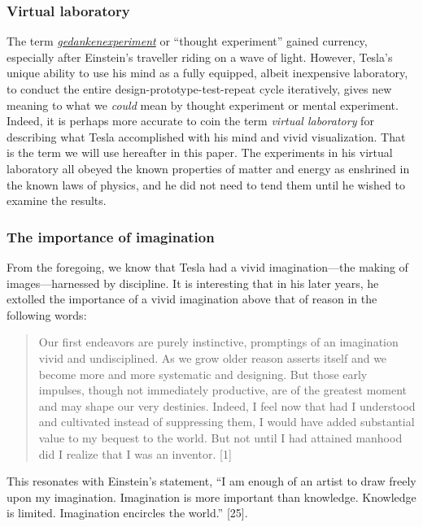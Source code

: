 \documentclass[
  12pt,
  british,
  a4paper,
]{article}
\begin{document}
\hypertarget{virtual-laboratory}{%
\subsubsection{Virtual laboratory}\label{virtual-laboratory}}

The term
\href{https://www.britannica.com/science/Gedankenexperiment}{\emph{gedankenexperiment}}
or ``thought experiment'' gained currency, especially after Einstein's
traveller riding on a wave of light. However, Tesla's unique ability to
use his mind as a fully equipped, albeit inexpensive laboratory, to
conduct the entire design-prototype-test-repeat cycle iteratively, gives
new meaning to what we \emph{could} mean by thought experiment or mental
experiment. Indeed, it is perhaps more accurate to coin the term
\emph{virtual laboratory} for describing what Tesla accomplished with
his mind and vivid visualization. That is the term we will use hereafter
in this paper. The experiments in his virtual laboratory all obeyed the
known properties of matter and energy as enshrined in the known laws of
physics, and he did not need to tend them until he wished to examine the
results.

\hypertarget{the-importance-of-imagination}{%
\subsubsection{The importance of
imagination}\label{the-importance-of-imagination}}

From the foregoing, we know that Tesla had a vivid imagination---the
making of images---harnessed by discipline. It is interesting that in
his later years, he extolled the importance of a vivid imagination above
that of reason in the following words:

\begin{quote}
Our first endeavors are purely instinctive, promptings of an imagination
vivid and undisciplined. As we grow older reason asserts itself and we
become more and more systematic and designing. But those early impulses,
though not immediately productive, are of the greatest moment and may
shape our very destinies. Indeed, I feel now that had I understood and
cultivated instead of suppressing them, I would have added substantial
value to my bequest to the world. But not until I had attained manhood
did I realize that I was an inventor. {[}1{]}
\end{quote}

This resonates with Einstein's statement, ``I am enough of an artist to
draw freely upon my imagination. Imagination is more important than
knowledge. Knowledge is limited. Imagination encircles the world.''
{[}25{]}.
\end{document}
